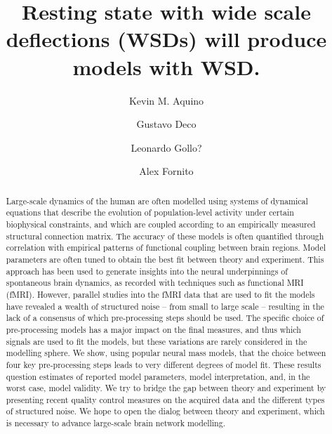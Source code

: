 \documentclass[oneside]{./zHenriquesLab-StyleBioRxiv}
\begin{document}
\title{Resting state with wide scale deflections (WSDs) will produce models with WSD.}

\author[1,*]{Kevin M. Aquino}
\author[1,2]{Gustavo Deco}
\author[3]{Leonardo Gollo?}
\author[1]{Alex Fornito}


\maketitle

\begin{abstract}
Large-scale dynamics of the human are often modelled using systems of dynamical equations that describe the evolution of population-level activity under certain biophysical constraints, and which are coupled according to an empirically measured structural connection matrix. 
The accuracy of these models is often quantified through correlation with empirical patterns of functional coupling between brain regions. 
Model parameters are often tuned to obtain the best fit between theory and experiment. This approach has been used to generate insights into the neural underpinnings of spontaneous brain dynamics, as recorded with techniques such as functional MRI (fMRI).
However, parallel studies into the fMRI data that are used to fit the models have revealed a wealth of structured noise – from small to large scale – resulting in the lack of a consensus of which pre-processing steps should be used. 
The specific choice of pre-processing models has a major impact on the final measures, and thus which signals are used to fit the models, but these variations are rarely considered in the modelling sphere. 
We show, using  popular neural mass models, that the choice between four key pre-processing steps leads to very different degrees of model fit. 
These results question estimates of reported model parameters, model interpretation, and, in the worst case, model validity. 
We try to bridge the gap between theory and experiment by presenting recent quality control measures on the acquired data and the different types of structured noise. 
We hope to open the dialog between theory and experiment, which is necessary to advance large-scale brain network modelling.
\end{abstract}
\end{document}
